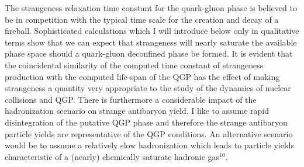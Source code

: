 \begin{mdframed}[linecolor=gray,roundcorner=12pt,backgroundcolor=Dandelion!15,linewidth=1pt,leftmargin=0cm,rightmargin=0cm,topline=true,bottomline=true,skipabove=12pt]
The strangeness relaxation time constant for the quark-gluon phase is
believed to be in competition with the typical time scale for the
creation and decay of a fireball. Sophisticated calculations which I will
introduce below only in qualitative terms show that we can expect that
strangeness will nearly saturate the available phase space should a
quark-gluon deconfined phase be formed. It is evident that the
coincidental similarity of the computed time constant of strangeness
production with the computed life-span of the QGP has the effect of
making strangeness a quantity very appropriate to the study of the
dynamics of nuclear collisions and QGP. There is furthermore a
considerable impact of the hadronization scenario on strange antibaryon
yield. I like to assume rapid disintegration of the putative QGP phase 
and therefore the strange antibaryon particle yields are representative
of the QGP conditions. An alternative  scenario would be to assume a
relatively slow hadronization which leads to particle yields
characteristic of a (nearly) chemically saturate  hadronic gas$^{10}$.
 

\end{mdframed}
